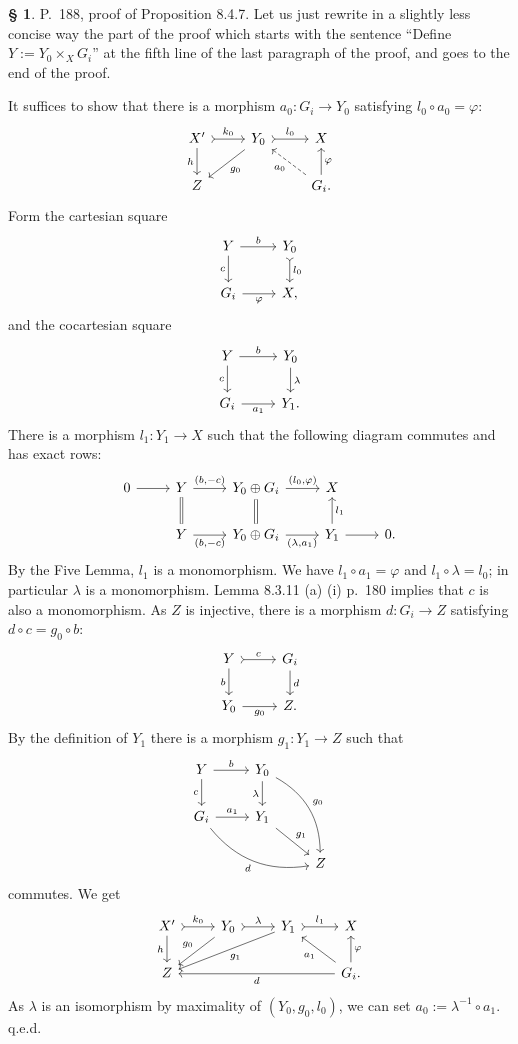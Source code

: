 \documentclass[12pt]{article}
\theoremstyle{remark}
\theoremstyle{definition}
\newtheorem{s}[thm]{\S}
\begin{document}
\begin{s} 
P.~188, proof of Proposition 8.4.7. Let us just rewrite in a slightly less concise way the part of the proof which starts with the sentence ``Define $Y:=Y_0\times_XG_i$'' at the fifth line of the last paragraph of the proof, and goes to the end of the proof. 

It suffices to show that there is a morphism $a_0:G_i\to Y_0$ satisfying $l_0\circ a_0=\varphi$:
$$
\begin{tikzcd}
X'\ar{d}[swap]{h}\ar[tail]{r}{k_0}&Y_0\ar{dl}{g_0}\ar[tail]{r}{l_0}&X\\ 
Z&&G_i.\ar[dashed]{ul}{a_0}\ar{u}[swap]{\varphi}
\end{tikzcd}
$$ 
Form the cartesian square 
$$
\begin{tikzcd}
Y\ar{r}{b}\ar[swap]{d}{c}&Y_0\ar[tail]{d}{l_0}\\
G_i\ar[swap]{r}{\varphi}&X,
\end{tikzcd}
$$
and the cocartesian square 
$$
\begin{tikzcd}
Y\ar{r}{b}\ar[swap]{d}{c}&Y_0\ar{d}{\lambda}\\
G_i\ar[swap]{r}{a_1}&Y_1.
\end{tikzcd}
$$ 
There is a morphism $l_1:Y_1\to X$ such that the following diagram commutes and has exact rows: 
$$
\begin{tikzcd}
0\ar{r}&Y\ar[equal]{d}\ar{r}{(b,-c)}&Y_0\oplus G_i\ar[equal]{d}\ar{r}{(l_0,\varphi)}&X\\
&Y\ar{r}[swap]{(b,-c)}&Y_0\oplus G_i\ar{r}[swap]{(\lambda,a_1)}&Y_1\ar{r}\ar{u}[swap]{l_1}&0.
\end{tikzcd}
$$ 
By the Five Lemma, $l_1$ is a monomorphism. We have $l_1\circ a_1=\varphi$ and $l_1\circ\lambda=l_0$; in particular $\lambda$ is a monomorphism. Lemma 8.3.11 (a) (i) p.~180 implies that $c$ is also a monomorphism. As $Z$ is injective, there is a morphism $d:G_i\to Z$ satisfying $d\circ c=g_0\circ b$:
$$
\begin{tikzcd}
Y\ar{d}[swap]{b}\ar[tail]{r}{c}&G_i\ar{d}{d}\\ 
Y_0\ar{r}[swap]{g_0}&Z.
\end{tikzcd}
$$ 
By the definition of $Y_1$ there is a morphism $g_1:Y_1\to Z$ such that 
$$
\begin{tikzcd}
Y\ar{r}{b}\ar[swap]{d}{c}&Y_0\ar{d}[swap]{\lambda}\ar[bend left]{ddr}{g_0}\\
G_i\ar{r}{a_1}\ar[bend right]{rrd}[swap]{d}&Y_1\ar{dr}{g_1}\\ 
{}&{}&Z
\end{tikzcd}
$$ 
commutes. We get 
$$
\begin{tikzcd}
X'\ar{d}[swap]{h}\ar[tail]{r}{k_0}&Y_0\ar{dl}[swap]{g_0}\ar[tail]{r}{\lambda}&Y_1\ar{dll}{g_1}\ar[tail]{r}{l_1}&X\\ 
Z&&&G_i.\ar{u}[swap]{\varphi}\ar{lll}{d}\ar{ul}{a_1}
\end{tikzcd}
$$ 
As $\lambda$ is an isomorphism by maximality of $(Y_0,g_0,l_0)$, we can set $a_0:=\lambda^{-1}\circ a_1$. q.e.d.
\end{s}
\end{document}
